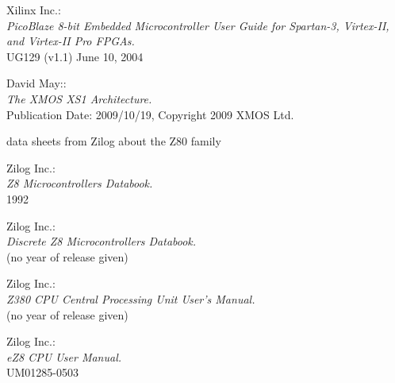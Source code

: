  Xilinx Inc.: \\
                 {\em PicoBlaze 8-bit Embedded Microcontroller User Guide
                 for Spartan-3, Virtex-II, and Virtex-II Pro FPGAs.\/} \\
                 UG129 (v1.1) June 10, 2004
                          
 David May:: \\
               {\em The XMOS XS1 Architecture.\/} \\
               Publication Date: 2009/10/19, Copyright 2009 XMOS Ltd.

 data sheets from Zilog about the Z80 family

 Zilog Inc.: \\
                {\em Z8 Microcontrollers Databook.\/} \\
                1992

 Zilog Inc.: \\
                  {\em Discrete Z8 Microcontrollers Databook.\/} \\
                  (no year of release given)

 Zilog Inc.: \\
                  {\em Z380 CPU Central Processing Unit User's
                  Manual.\/} \\
                  (no year of release given)

 Zilog Inc.: \\
               {\em eZ8 CPU User Manual.\/} \\
               UM01285-0503
